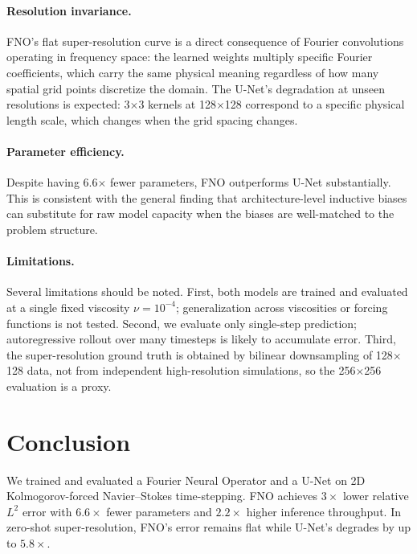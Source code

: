 \documentclass[sigconf,nonacm]{acmart}
\begin{document}
\paragraph{Resolution invariance.}
FNO's flat super-resolution curve is a direct consequence of Fourier convolutions
operating in frequency space: the learned weights multiply specific Fourier
coefficients, which carry the same physical meaning regardless of how many spatial
grid points discretize the domain.
The U-Net's degradation at unseen resolutions is expected: 3$\times$3 kernels at
128$\times$128 correspond to a specific physical length scale, which changes when
the grid spacing changes.

\paragraph{Parameter efficiency.}
Despite having 6.6$\times$ fewer parameters, FNO outperforms U-Net substantially.
This is consistent with the general finding that architecture-level inductive
biases can substitute for raw model capacity when the biases are well-matched to
the problem structure.

\paragraph{Limitations.}
Several limitations should be noted.
First, both models are trained and evaluated at a single fixed viscosity
$\nu = 10^{-4}$; generalization across viscosities or forcing functions is not
tested.
Second, we evaluate only single-step prediction; autoregressive rollout over many
timesteps is likely to accumulate error.
Third, the super-resolution ground truth is obtained by bilinear downsampling
of 128$\times$128 data, not from independent high-resolution simulations, so the
256$\times$256 evaluation is a proxy.

\section{Conclusion}
\label{sec:conclusion}

We trained and evaluated a Fourier Neural Operator and a U-Net on 2D
Kolmogorov-forced Navier--Stokes time-stepping.
FNO achieves $3\times$ lower relative $L^2$ error with $6.6\times$ fewer
parameters and $2.2\times$ higher inference throughput.
In zero-shot super-resolution, FNO's error remains flat while U-Net's degrades
by up to $5.8\times$.
\end{document}
